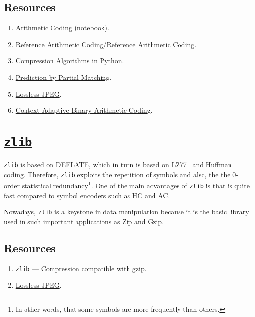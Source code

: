 \subsection*{Resources}
\begin{enumerate}
\item
  \href{https://github.com/vicente-gonzalez-ruiz/arithmetic_coding/blob/master/src/arithmetic_coding/arithmetic_coding.ipynb}{Arithmetic
    Coding (notebook)}.
\item \href{https://www.nayuki.io/page/reference-arithmetic-coding}{Reference Arithmetic Coding}/\href{https://github.com/nayuki/Reference-arithmetic-coding}{Reference Arithmetic Coding}.
\item \href{https://www.inference.org.uk/mackay/python/compress/#AC}{Compression Algorithms in Python}.
\item \href{https://en.wikipedia.org/wiki/Prediction_by_partial_matching}{Prediction by Partial Matching}.
\item \href{https://en.wikipedia.org/wiki/Lossless_JPEG}{Lossless JPEG}.
\item \href{https://en.wikipedia.org/wiki/Context-adaptive_binary_arithmetic_coding}{Context-Adaptive Binary Arithmetic Coding}.
\end{enumerate}

\section{\href{https://zlib.net/}{\texttt{zlib}}}

\texttt{zlib} is based on
\href{https://en.wikipedia.org/wiki/Deflate}{DEFLATE}, which in turn
is based on LZ77~\cite{vruiz__LZW,ruiz2000compresion} and Huffman
coding. Therefore, \texttt{zlib} exploits the repetition of symbols
and also, the the 0-order statistical redundancy\footnote{In other
  words, that some symbols are more frequently than others.}. One of
the main advantages of \texttt{zlib} is that is quite fast compared to
symbol encoders such as HC and AC.

Nowadays, \texttt{zlib} is a keystone in data manipulation because it
is the basic library used in such important applications as
\href{https://en.wikipedia.org/wiki/ZIP_(file_format)}{Zip} and
\href{https://en.wikipedia.org/wiki/Gzip}{Gzip}.

\subsection*{Resources}
\begin{enumerate}
\item \href{https://docs.python.org/3/library/zlib.html}{\texttt{zlib}
    — Compression compatible with gzip}.
\item \href{https://en.wikipedia.org/wiki/Lossless_JPEG}{Lossless JPEG}.
\end{enumerate}

